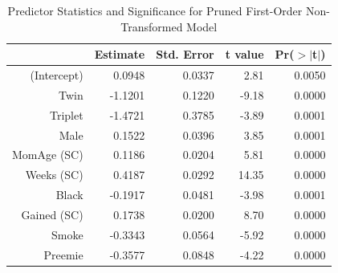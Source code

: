 \documentclass{article}\usepackage[]{graphicx}\usepackage[]{xcolor}
\begin{document}
\begin{table}[H]
\centering
\begin{tabular}{rrrrr}
  \hline
 & Estimate & Std. Error & t value & Pr($>$$|$t$|$) \\ 
  \hline
(Intercept) & 0.0948 & 0.0337 & 2.81 & 0.0050 \\ 
  Twin & -1.1201 & 0.1220 & -9.18 & 0.0000 \\ 
  Triplet & -1.4721 & 0.3785 & -3.89 & 0.0001 \\ 
  Male & 0.1522 & 0.0396 & 3.85 & 0.0001 \\ 
  MomAge (SC) & 0.1186 & 0.0204 & 5.81 & 0.0000 \\ 
  Weeks (SC) & 0.4187 & 0.0292 & 14.35 & 0.0000 \\ 
  Black & -0.1917 & 0.0481 & -3.98 & 0.0001 \\ 
  Gained (SC) & 0.1738 & 0.0200 & 8.70 & 0.0000 \\ 
  Smoke & -0.3343 & 0.0564 & -5.92 & 0.0000 \\ 
  Preemie & -0.3577 & 0.0848 & -4.22 & 0.0000 \\ 
   \hline
\end{tabular}
\caption{Predictor Statistics and Significance for Pruned First-Order Non-Transformed Model} 
\label{pruned.first.model.un}
\end{table}
\end{document}
